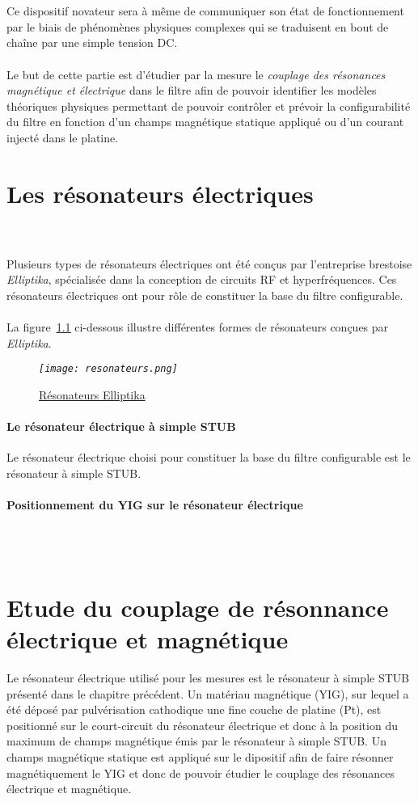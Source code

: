 \documentclass[12pt,fleqn]{book} %
\begin{document}
~\\\\
\normalsize Ce dispositif novateur sera à même de communiquer son état de fonctionnement par le
biais de phénomènes physiques complexes qui se traduisent en bout de chaîne par une simple tension
DC.
~\\\\Le but de cette partie est d'étudier par la mesure le \emph{couplage des résonances magnétique et électrique} dans le filtre afin de pouvoir identifier les modèles théoriques physiques permettant de pouvoir contrôler et prévoir la configurabilité du filtre en fonction d'un champs magnétique statique appliqué ou d'un courant injecté dans le platine.

\setcounter{chapter}{0}
\chapter{Les résonateurs électriques} 
~\\\\\indent Plusieurs types de résonateurs électriques ont été conçus par l'entreprise brestoise \emph{Elliptika}, spécialisée dans la conception de circuits RF et hyperfréquences. Ces résonateurs électriques ont pour rôle de constituer la base du filtre configurable.
~\\\\La figure~\underline{\color{blue}\ref{resonateurs}} ci-dessous illustre différentes formes de résonateurs conçues par \emph{Elliptika}.
\begin{figure}[H]
	\centering
	\itshape
	\texttt{[image: resonateurs.png]}
	\caption{\label{resonateurs} \underline{Résonateurs Elliptika}}
\end{figure}
\subsubsection{Le résonateur électrique à simple STUB}
Le résonateur électrique choisi pour constituer la base du filtre configurable est le résonateur à simple STUB. 
\subsubsection{Positionnement du YIG sur le résonateur électrique}

~\\\\
\chapter{Etude du couplage de résonnance électrique et magnétique }
Le résonateur électrique utilisé pour les mesures est le résonateur à simple STUB présenté dans le chapitre précédent. Un matériau magnétique (YIG), sur lequel a été déposé par pulvérisation cathodique une fine couche de platine (Pt), est positionné sur le court-circuit du résonateur électrique et donc à la position du maximum de champs magnétique émis par le résonateur à simple STUB. Un champs magnétique statique est appliqué sur le dipositif afin de faire résonner magnétiquement le YIG et donc de pouvoir étudier le couplage des résonances électrique et magnétique.
\end{document}
